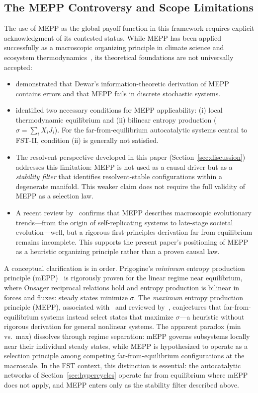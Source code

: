 \documentclass[12pt,a4paper]{article}
\theoremstyle{remark}
\begin{document}
\subsection{The MEPP Controversy and Scope Limitations}

The use of MEPP as the global payoff function in this framework requires explicit acknowledgment of its contested status. While MEPP has been applied successfully as a macroscopic organizing principle in climate science and ecosystem thermodynamics~\citep{MEPP2006}, its theoretical foundations are not universally accepted:

\begin{itemize}
\item \citet{GrinsteinLinsker2007} demonstrated that Dewar's information-theoretic derivation of MEPP contains errors and that MEPP fails in discrete stochastic systems.
\item \citet{Martyushev2010} identified two necessary conditions for MEPP applicability: (i) local thermodynamic equilibrium and (ii) bilinear entropy production ($\sigma = \sum_i X_i J_i$). For the far-from-equilibrium autocatalytic systems central to FST-II, condition (ii) is generally not satisfied.
\item The resolvent perspective developed in this paper (Section~\ref{sec:discussion}) addresses this limitation: MEPP is not used as a causal driver but as a \emph{stability filter} that identifies resolvent-stable configurations within a degenerate manifold. This weaker claim does not require the full validity of MEPP as a selection law.
\item A recent review by~\citet{Toma2025} confirms that MEPP describes macroscopic evolutionary trends---from the origin of self-replicating systems to late-stage societal evolution---well, but a rigorous first-principles derivation far from equilibrium remains incomplete. This supports the present paper's positioning of MEPP as a heuristic organizing principle rather than a proven causal law.
\end{itemize}

\noindent
A conceptual clarification is in order. Prigogine's \emph{minimum} entropy production principle (mEPP)~\citep{Prigogine1947} is rigorously proven for the linear regime near equilibrium, where Onsager reciprocal relations hold and entropy production is bilinear in forces and fluxes: steady states minimize $\sigma$. The \emph{maximum} entropy production principle (MEPP), associated with~\citet{Ziegler1963} and reviewed by~\citet{MEPP2006}, conjectures that far-from-equilibrium systems instead select states that maximize $\sigma$---a heuristic without rigorous derivation for general nonlinear systems. The apparent paradox (min vs.\ max) dissolves through regime separation: mEPP governs subsystems locally near their individual steady states, while MEPP is hypothesized to operate as a selection principle among competing far-from-equilibrium configurations at the macroscale. In the FST context, this distinction is essential: the autocatalytic networks of Section~\ref{sec:hypercycles} operate far from equilibrium where mEPP does not apply, and MEPP enters only as the stability filter described above.
\end{document}
